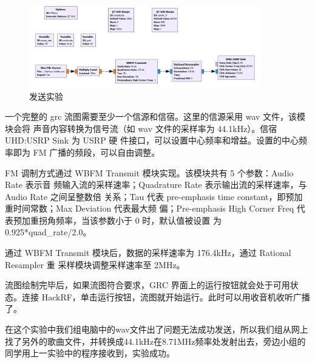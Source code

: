 \documentclass{../source/Experiment}
\begin{document}
        \begin{figure}[H]
            \centering
            \includegraphics[width = 0.9\textwidth]{lab7/send.png}
            \caption{发送实验}
        \end{figure}

        一个完整的 grc 流图需要至少一个信源和信宿。这里的信源采用 wav 文件，该模块会将 声音内容转换为信号流（如 wav 文件的采样率为 44.1kHz）。信宿 UHD:USRP Sink 为 USRP 硬 件接口，可以设置中心频率和增益。设置的中心频率即为 FM 广播的频段，可以自由调整。

        FM 调制方式通过 WBFM Transmit 模块实现。该模块共有 5 个参数：Audio Rate 表示音 频输入流的采样速率；Quadrature Rate 表示输出流的采样速率，与 Audio Rate 之间呈整数倍 关系；Tau 代表 pre-emphasis time constant，即预加重时间常数；Max Deviation 代表最大频 偏；Pre-emphasis High Corner Freq 代表预加重拐角频率，当该参数小于 0 时，默认值被设置
        为 0.925*quad\_rate/2.0。

        通过 WBFM Transmit 模块后，数据的采样速率为 176.4kHz，通过 Rational Resampler 重 采样模块调整采样速率至 2MHz。

        流图绘制完毕后，如果流图符合要求，GRC 界面上的运行按钮就会处于可用状态。连接 HackRF，单击运行按钮，流图就开始运行。此时可以用收音机收听广播了。

        在这个实验中我们组电脑中的wav文件出了问题无法成功发送，所以我们组从网上找了另外的歌曲文件，并转换成44.1kHz在8.71MHz频率处发射出去，旁边小组的同学用上一实验中的程序接收到，实验成功。
\end{document}
